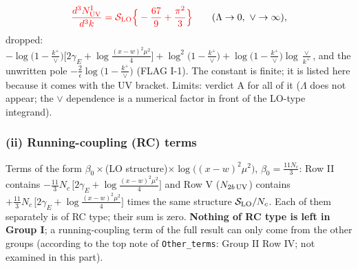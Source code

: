 \documentclass[9pt]{article}
\numberwithin{equation}{section}
\begin{document}
\begin{align}
{\color{red}\frac{d^{3}N^{\rm I}_{\rm UV}}{d^{3}k}=\mathcal{S}_{\rm LO}\Big\{-\frac{67}{9}+\frac{\pi^{2}}{3}\Big\}}\qquad(\Lambda\to0,\ \vee\to\infty),
\end{align}
{\color{orange}dropped: $-\log\big(1-\frac{k^{+}}{\vee}\big)\big[2\gamma_{E}+\log\frac{(x-w)^{2}\mu^{2}}{4}\big]+\log^{2}\big(1-\frac{k^{+}}{\vee}\big)+\log\big(1-\frac{k^{+}}{\vee}\big)\log\frac{\vee}{k^{+}}$,} and the unwritten pole $-\frac{2}{\epsilon}\log\big(1-\frac{k^{+}}{\vee}\big)$ (FLAG I-1). The constant is finite; it is listed here because it comes with the UV bracket. Limits: verdict A for all of it ($\Lambda$ does not appear; the $\vee$ dependence is a numerical factor in front of the LO-type integrand).

\subsubsection*{(ii) Running-coupling (RC) terms}
Terms of the form $\beta_{0}\times$(LO structure)$\times\log\big((x-w)^{2}\mu^{2}\big)$, $\beta_{0}=\frac{11N_{c}}{3}$: Row II contains $-\frac{11}{3}N_{c}\,\big[2\gamma_{E}+\log\frac{(x-w)^{2}\mu^{2}}{4}\big]$ and Row V ($N_{2b\,\rm UV}$) contains $+\frac{11}{3}N_{c}\,\big[2\gamma_{E}+\log\frac{(x-w)^{2}\mu^{2}}{4}\big]$ times the same structure $\mathcal{S}_{\rm LO}/N_{c}$. Each of them separately is of RC type; their sum is zero. \textbf{Nothing of RC type is left in Group I}; a running-coupling term of the full result can only come from the other groups (according to the top note of \texttt{Other\_terms}: Group II Row IV; not examined in this part).
\end{document}
